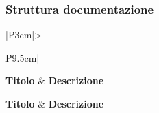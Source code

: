 \subsubsection{Struttura documentazione}

\bgroup
\begin{adjustwidth}{-0.5cm}{-0.5cm}
  \begin{longtable}{|P{3cm}|>{\raggedright\arraybackslash}P{9.5cm}|}
    \hline
		\textbf{Titolo} & \textbf{Descrizione} \\ 
		\hline
		\endfirsthead

		\hline
		\textbf{Titolo} & \textbf{Descrizione} \\ 
		\hline
		\endhead

		\hline
		 \\ 
		\hline
		\endfoot

		\hline
		\endlastfoot


\end{longtable}
\end{adjustwidth}
